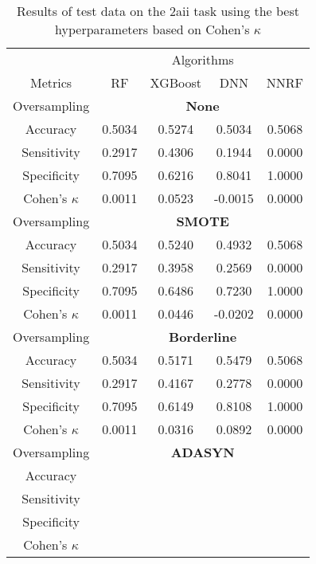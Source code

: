 \begin{table}[!htb]
\centering
\caption{Results of test data on the 2aii task using the best hyperparameters based on Cohen's $\kappa$}
\label{tab:2aii_test_results}
\begin{tabular}{c | c c c c}
\hline
 & \multicolumn{4}{c}{Algorithms}\\ 
Metrics &RF & XGBoost & DNN & NNRF\\ 
\hline
Oversampling &\multicolumn{4}{|c}{\textbf{None}}\\ 
\hline
Accuracy & 0.5034 & 0.5274 & 0.5034 & 0.5068\\ 
Sensitivity & 0.2917 & 0.4306 & 0.1944 & 0.0000\\ 
Specificity & 0.7095 & 0.6216 & 0.8041 & 1.0000\\ 
Cohen's $\kappa$ & 0.0011 & 0.0523 & -0.0015 & 0.0000\\ 
\hline
Oversampling &\multicolumn{4}{|c}{\textbf{SMOTE}}\\ 
\hline
Accuracy & 0.5034 & 0.5240 & 0.4932 & 0.5068\\ 
Sensitivity & 0.2917 & 0.3958 & 0.2569 & 0.0000\\ 
Specificity & 0.7095 & 0.6486 & 0.7230 & 1.0000\\ 
Cohen's $\kappa$ & 0.0011 & 0.0446 & -0.0202 & 0.0000\\ 
\hline
Oversampling &\multicolumn{4}{|c}{\textbf{Borderline}}\\ 
\hline
Accuracy & 0.5034 & 0.5171 & 0.5479 & 0.5068\\ 
Sensitivity & 0.2917 & 0.4167 & 0.2778 & 0.0000\\ 
Specificity & 0.7095 & 0.6149 & 0.8108 & 1.0000\\ 
Cohen's $\kappa$ & 0.0011 & 0.0316 & 0.0892 & 0.0000\\ 
\hline
Oversampling &\multicolumn{4}{|c}{\textbf{ADASYN}}\\ 
\hline
Accuracy &  &  &  & \\ 
Sensitivity &  &  &  & \\ 
Specificity &  &  &  & \\ 
Cohen's $\kappa$ &  &  &  & \\ 
\hline
\end{tabular}
\end{table}


